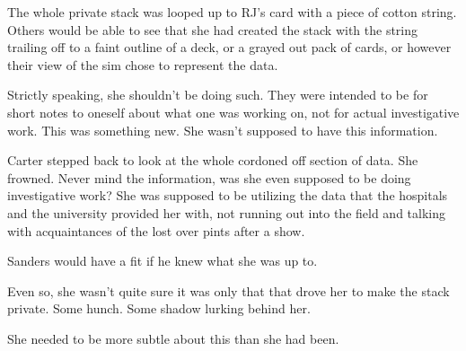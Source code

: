The whole private stack was looped up to RJ's card with a piece of cotton string. Others would be able to see that she had created the stack with the string trailing off to a faint outline of a deck, or a grayed out pack of cards, or however their view of the sim chose to represent the data.

Strictly speaking, she shouldn't be doing such. They were intended to be for short notes to oneself about what one was working on, not for actual investigative work. This was something new. She wasn't supposed to have this information.

Carter stepped back to look at the whole cordoned off section of data. She frowned. Never mind the information, was she even supposed to be doing investigative work? She was supposed to be utilizing the data that the hospitals and the university provided her with, not running out into the field and talking with acquaintances of the lost over pints after a show.

Sanders would have a fit if he knew what she was up to.

Even so, she wasn't quite sure it was only that that drove her to make the stack private. Some hunch. Some shadow lurking behind her.

She needed to be more subtle about this than she had been.
